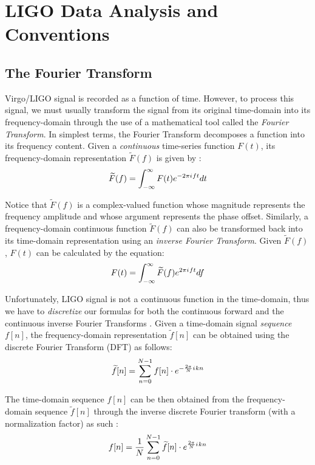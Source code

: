 \documentclass[reprint,
letterpaper,
 amsmath,amssymb,
 aps,
]{revtex4-2}
\newcommand{\iu}{{i\mkern1mu}}
\begin{document}
\section{LIGO Data Analysis and Conventions}
\subsection{The Fourier Transform}
Virgo/LIGO signal is recorded as a function of time. However, to process this signal, we must usually transform the signal from its original time-domain into its frequency-domain through the use of a mathematical tool called the \textit{Fourier Transform}. In simplest terms, the Fourier Transform decomposes a function into its frequency content. Given a \textit{continuous} time-series function $F(t)$, its frequency-domain representation $\widetilde{F}(f)$ is given by \cite{dsptextbook}:
\begin{equation}
\widetilde{F}(f) = \int_{-\infty}^{\infty}F(t)e^{-2\pi\iu ft} dt
\end{equation}

Notice that $\widetilde{F}(f)$ is a complex-valued function whose magnitude represents the frequency amplitude and whose argument represents the phase offset. Similarly, a frequency-domain continuous function $\widetilde{F}(f)$ can also be transformed back into its time-domain representation using an \textit{inverse Fourier Transform}. Given $\widetilde{F}(f)$, $F(t)$ can be calculated by the equation:
\begin{equation}
F(t) = \int_{-\infty}^{\infty}\widetilde{F}(f)e^{2\pi\iu ft} df
\end{equation}

Unfortunately, LIGO signal is not a continuous function in the time-domain, thus we have to \textit{discretize} our formulas for both the continuous forward and the continuous inverse Fourier Transforms \cite{dsptextbook}. Given a time-domain signal \textit{sequence} $f[n]$, the frequency-domain representation $\widetilde{f}[n]$ can be obtained using the discrete Fourier Transform (DFT) as follows\cite{roberts_2020}:
\begin{equation}
\widetilde{f}[n]=\sum _{n=0}^{N-1}f[n]\cdot e^{-{\frac {2\pi}{N}\iu kn}}
\end{equation}

The time-domain sequence $f[n]$ can be then obtained from the frequency-domain sequence $\widetilde{f}[n]$ through the inverse discrete Fourier transform (with a normalization factor) as such \cite{roberts_2020}:
\begin{equation}
f[n]=\frac{1}{N}\sum _{n=0}^{N-1}\widetilde{f}[n]\cdot e^{{\frac {2\pi}{N}\iu kn}}
\end{equation}
\end{document}
